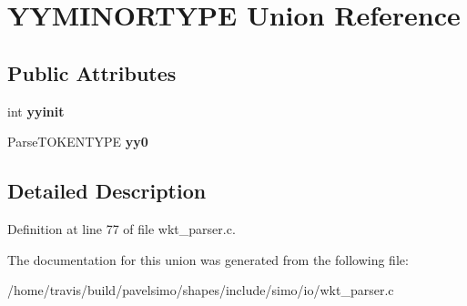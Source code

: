 \hypertarget{union_y_y_m_i_n_o_r_t_y_p_e}{\section{Y\-Y\-M\-I\-N\-O\-R\-T\-Y\-P\-E Union Reference}
\label{union_y_y_m_i_n_o_r_t_y_p_e}
}
\subsection*{Public Attributes}
\begin{DoxyCompactItemize}
\item 
\hypertarget{union_y_y_m_i_n_o_r_t_y_p_e_a6cec97309f473b42b70a9738d7cbd5ba}{int {\bfseries yyinit}}\label{union_y_y_m_i_n_o_r_t_y_p_e_a6cec97309f473b42b70a9738d7cbd5ba}

\item 
\hypertarget{union_y_y_m_i_n_o_r_t_y_p_e_a8cb8fd685f7268dccdcb7bdb80308242}{Parse\-T\-O\-K\-E\-N\-T\-Y\-P\-E {\bfseries yy0}}\label{union_y_y_m_i_n_o_r_t_y_p_e_a8cb8fd685f7268dccdcb7bdb80308242}

\end{DoxyCompactItemize}


\subsection{Detailed Description}


Definition at line 77 of file wkt\-\_\-parser.\-c.



The documentation for this union was generated from the following file\-:\begin{DoxyCompactItemize}
\item 
/home/travis/build/pavelsimo/shapes/include/simo/io/wkt\-\_\-parser.\-c\end{DoxyCompactItemize}
